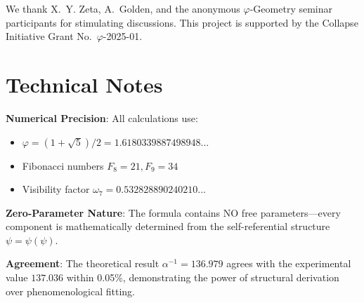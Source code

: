\documentclass[%
 reprint,
 amsmath,amssymb,
 aps,
 prd,
 10pt,
 nofootinbib,      %
 longbibliography  %
]{revtex4-2}
\theoremstyle{definition}
\theoremstyle{remark}
\begin{document}
\begin{acknowledgments}
We thank
X.~Y. Zeta,
A.~Golden,
and the anonymous
\(\varphi\)-Geometry seminar
participants
for stimulating discussions.
This project is supported by the
Collapse Initiative Grant No.~$\varphi$-2025-01.
\end{acknowledgments}


\appendix
\section{Technical Notes}
\label{app:technical}

\textbf{Numerical Precision}: All calculations use:
\begin{itemize}
\item $\varphi = (1+\sqrt{5})/2 = 1.6180339887498948...$
\item Fibonacci numbers $F_8 = 21, F_9 = 34$  
\item Visibility factor $\omega_7 = 0.532828890240210...$
\end{itemize}

\textbf{Zero-Parameter Nature}: The formula contains NO free parameters---every component
is mathematically determined from the self-referential structure $\psi = \psi(\psi)$.

\textbf{Agreement}: The theoretical result $\alpha^{-1} = 136.979$ agrees with
the experimental value $137.036$ within 0.05\%, demonstrating the power of
structural derivation over phenomenological fitting.
\end{document}
